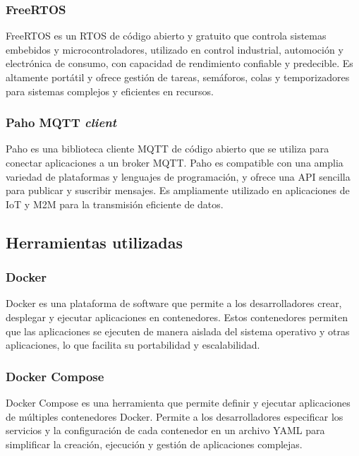 \subsubsection{FreeRTOS}

FreeRTOS \citep{free-rtos} es un RTOS de código abierto y gratuito que controla sistemas embebidos y microcontroladores, utilizado en control industrial, automoción y electrónica de consumo, con capacidad de rendimiento confiable y predecible. Es altamente portátil y ofrece gestión de tareas, semáforos, colas y temporizadores para sistemas complejos y eficientes en recursos.


\subsubsection{Paho MQTT \textit{client}}

Paho \citep{paho-mqtt} es una biblioteca cliente MQTT de código abierto que se utiliza para conectar aplicaciones a un broker MQTT. Paho es compatible con una amplia variedad de plataformas y lenguajes de programación, y ofrece una API sencilla para publicar y suscribir mensajes. Es ampliamente utilizado en aplicaciones de IoT y M2M para la transmisión eficiente de datos.


\subsection{Herramientas utilizadas}


\subsubsection{Docker}

Docker \citep{docker} es una plataforma de software que permite a los desarrolladores crear, desplegar y ejecutar aplicaciones en contenedores. Estos contenedores permiten que las aplicaciones se ejecuten de manera aislada del sistema operativo y otras aplicaciones, lo que facilita su portabilidad y escalabilidad. 


\subsubsection{Docker Compose}

Docker Compose \citep{docker-compose} es una herramienta que permite definir y ejecutar aplicaciones de múltiples contenedores Docker. Permite a los desarrolladores especificar los servicios y la configuración de cada contenedor en un archivo YAML para simplificar la creación, ejecución y gestión de aplicaciones complejas. 


